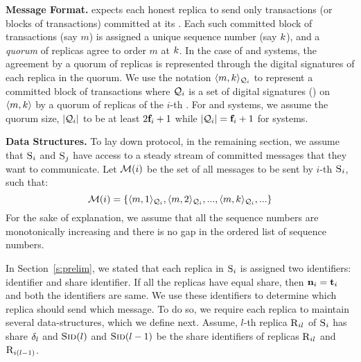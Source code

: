 {\bf Message Format.}
\Scrooge{} expects each honest replica to send only transactions (or blocks of transactions) 
committed at its \RSM{}. 
Each such committed block of transactions (say $m$) is assigned a unique sequence number (say $k$), and 
a {\em quorum} of \RSM{} replicas agree to order $m$ at $k$.
In the case of \BFT{} and \PoS{} systems, the agreement by a quorum of replicas is represented through 
the digital signatures of each replica in the quorum. 
We use the notation $\langle m, k\rangle_{\mathcal{Q}_{i}}$ to represent a committed block of transactions where
$\mathcal{Q}_{i}$ is a set of digital signatures (\DS{}) on $\langle m, k \rangle$ by a quorum of replicas 
of the $i$-th \RSM{}.
For \BFT{} and \PoS{} systems, we assume the quorum size, $\lvert \mathcal{Q}_{i} \rvert$ to be at least $2\textbf{f}_{i}+1$ 
while $\lvert \mathcal{Q}_{i} \rvert = \textbf{f}_{i} + 1$ for \CFT{} systems.



{\bf Data Structures.} 
To lay down \Scrooge{} protocol, in the remaining section, we assume that  $\textsc{S}_{i}$ and $\textsc{S}_{j}$ have access to a 
steady stream of committed messages that they want to communicate.
Let $\mathcal{M}(i)$ be the set of all messages to be sent by $i$-th \RSM{} $\textsc{S}_{i}$, such that:
\begin{equation*}
\mathcal{M}(i) = \{\langle m, 1\rangle_{\mathcal{Q}_{i}},  \langle m, 2\rangle_{\mathcal{Q}_{i}}, ... , \langle m, k\rangle_{\mathcal{Q}_{i}}, ... \} 
\end{equation*}
For the sake of explanation, we assume that all the sequence numbers are monotonically increasing and 
there is no gap in the ordered list of sequence numbers.

In Section~\ref{s:prelim}, we stated that each replica in \RSM{} $\textsc{S}_{i}$ is assigned two identifiers:
\RSM{} identifier and share identifier.
If all the replicas have equal share, then $\textbf{n}_{i} = \textbf{t}_{i}$ and both the identifiers are same.
We use these identifiers to determine which replica should send which message.
To do so, we require each replica to maintain several data-structures, which we define next.
Assume, $l$-th replica $\textsc{R}_{{i}{l}}$ of \RSM{} $\textsc{S}_{i}$ has share ${\delta}_{l}$ and 
$\textsc{Sid}({l})$ and $\textsc{Sid}({l-1})$ be the share identifiers of replicas $\textsc{R}_{{i}{l}}$ and $\textsc{R}_{{i}{(l-1)}}$.


